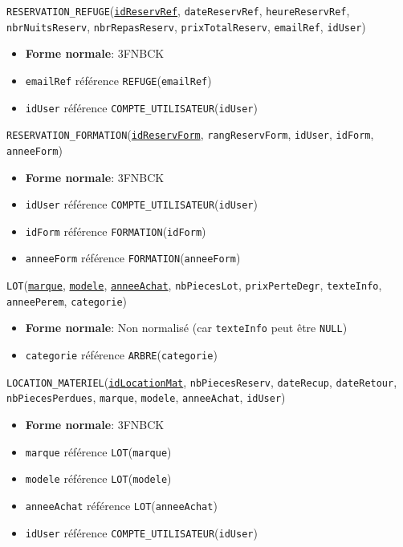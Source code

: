 \documentclass[12pt, a4paper]{article}
\newcommand\att[1]{\textnhtt{#1}}
\begin{document}
\att{RESERVATION\_REFUGE}(\att{\underline{idReservRef}}, \att{dateReservRef}, \att{heureReservRef}, \att{nbrNuitsReserv}, \att{nbrRepasReserv}, \att{prixTotalReserv}, \att{emailRef}, \att{idUser})
\begin{itemize}
\item \textbf{Forme normale}: 3FNBCK
\item \att{emailRef} référence \att{REFUGE}(\att{emailRef})
\item \att{idUser} référence \att{COMPTE\_UTILISATEUR}(\att{idUser})
\end{itemize}

\att{RESERVATION\_FORMATION}(\att{\underline{idReservForm}}, \att{rangReservForm}, \att{idUser}, \att{idForm}, \att{anneeForm})
\begin{itemize}
\item \textbf{Forme normale}: 3FNBCK
\item \att{idUser} référence \att{COMPTE\_UTILISATEUR}(\att{idUser})
\item \att{idForm} référence \att{FORMATION}(\att{idForm})
\item \att{anneeForm} référence \att{FORMATION}(\att{anneeForm})
\end{itemize}

\att{LOT}(\att{\underline{marque}}, \att{\underline{modele}}, \att{\underline{anneeAchat}}, \att{nbPiecesLot}, \att{prixPerteDegr}, \att{texteInfo}, \att{anneePerem}, \att{categorie})
\begin{itemize}
\item \textbf{Forme normale}: Non normalisé (car \att{texteInfo} peut être \att{NULL})
\item \att{categorie} référence \att{ARBRE}(\att{categorie})
\end{itemize}

\att{LOCATION\_MATERIEL}(\att{\underline{idLocationMat}}, \att{nbPiecesReserv}, \att{dateRecup}, \att{dateRetour}, \att{nbPiecesPerdues}, \att{marque}, \att{modele}, \att{anneeAchat}, \att{idUser})
\begin{itemize}
\item \textbf{Forme normale}: 3FNBCK
\item \att{marque} référence \att{LOT}(\att{marque})
\item \att{modele} référence \att{LOT}(\att{modele})
\item \att{anneeAchat} référence \att{LOT}(\att{anneeAchat})
\item \att{idUser} référence \att{COMPTE\_UTILISATEUR}(\att{idUser})
\end{itemize}
\end{document}
